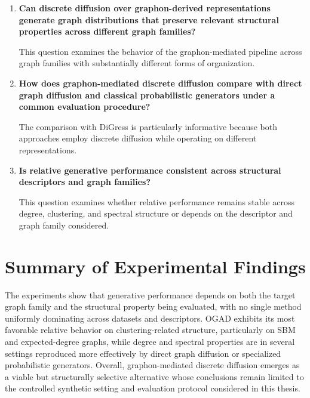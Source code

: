 \begin{enumerate}

    \item[\textbf{RQ1.}] \textbf{Can discrete diffusion over graphon-derived representations generate graph distributions that preserve relevant structural properties across different graph families?}

    This question examines the behavior of the graphon-mediated pipeline across graph families with substantially different forms of organization.

    \item[\textbf{RQ2.}] \textbf{How does graphon-mediated discrete diffusion compare with direct graph diffusion and classical probabilistic generators under a common evaluation procedure?}

    The comparison with DiGress is particularly informative because both approaches employ discrete diffusion while operating on different representations.

    \item[\textbf{RQ3.}] \textbf{Is relative generative performance consistent across structural descriptors and graph families?}

    This question examines whether relative performance remains stable across degree, clustering, and spectral structure or depends on the descriptor and graph family considered.

\end{enumerate}


\section{Summary of Experimental Findings}
\label{sec:intro_findings}

The experiments show that generative performance depends on both the target graph family and the structural property being evaluated, with no single method uniformly dominating across datasets and descriptors. OGAD exhibits its most favorable relative behavior on clustering-related structure, particularly on SBM and expected-degree graphs, while degree and spectral properties are in several settings reproduced more effectively by direct graph diffusion or specialized probabilistic generators. Overall, graphon-mediated discrete diffusion emerges as a viable but structurally selective alternative whose conclusions remain limited to the controlled synthetic setting and evaluation protocol considered in this thesis.



